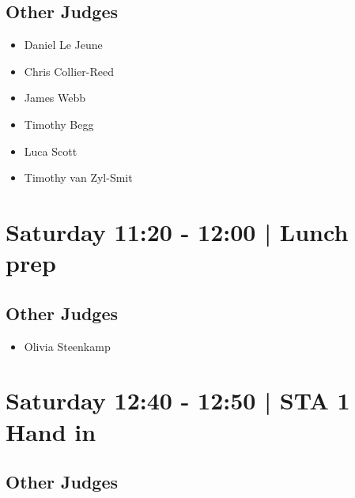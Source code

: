 \documentclass[10pt, A5]{article}
\begin{document}
                
        \subsection*{Other Judges}
        
            \begin{itemize}
                            \item Daniel Le Jeune
                            \item Chris Collier-Reed
                            \item James Webb
                            \item Timothy Begg
                            \item Luca Scott
                            \item Timothy van Zyl-Smit
                        \end{itemize}
        

            \section*{Saturday 11:20
        -
        12:00
        |
         Lunch prep}
        
                
        \subsection*{Other Judges}
        
            \begin{itemize}
                            \item Olivia Steenkamp
                        \end{itemize}
        

            \section*{Saturday 12:40
        -
        12:50
        |
         STA 1 Hand in}
        
                
        \subsection*{Other Judges}
        
            \begin{itemize}
                        \end{itemize}
        
\end{document}
